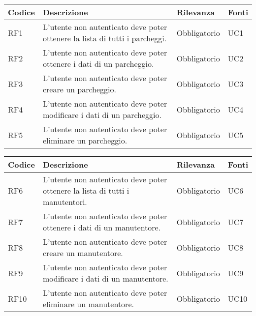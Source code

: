 \leavevmode\newline
\begin{table}
    \begin{tabular}{|p{1cm}|p{6cm}|p{1.9cm}|p{1.8cm}|} 
    \hline
    Codice & Descrizione & Rilevanza &  Fonti \\ 
    \hline
    RF1 & L'utente non autenticato deve poter ottenere la lista di tutti i parcheggi. & Obbligatorio & UC1 \\ 
    \hline
    RF2 & L'utente non autenticato deve poter ottenere i dati di un parcheggio. & Obbligatorio & UC2 \\ 
    \hline
    RF3 & L'utente non autenticato deve poter creare un parcheggio. & Obbligatorio & UC3 \\ 
    \hline
    RF4 & L'utente non autenticato deve poter modificare i dati di un parcheggio. & Obbligatorio & UC4 \\
    \hline
    RF5 & L'utente non autenticato deve poter eliminare un parcheggio. & Obbligatorio & UC5 \\ 
    \hline
    \end{tabular}
\end{table}

\leavevmode\newline
\begin{table}
    \begin{tabular}{|p{1cm}|p{6cm}|p{1.9cm}|p{1.8cm}|} 
    \hline
    Codice & Descrizione & Rilevanza &  Fonti \\ 
    \hline
    RF6 & L'utente non autenticato deve poter ottenere la lista di tutti i manutentori. & Obbligatorio & UC6 \\ 
    \hline
    RF7 & L'utente non autenticato deve poter ottenere i dati di un manutentore. & Obbligatorio & UC7 \\ 
    \hline
    RF8 & L'utente non autenticato deve poter creare un manutentore. & Obbligatorio & UC8 \\ 
    \hline
    RF9 & L'utente non autenticato deve poter modificare i dati di un manutentore. & Obbligatorio & UC9 \\
    \hline
    RF10 & L'utente non autenticato deve poter eliminare un manutentore. & Obbligatorio & UC10 \\ 
    \hline
    \end{tabular}
\end{table}

